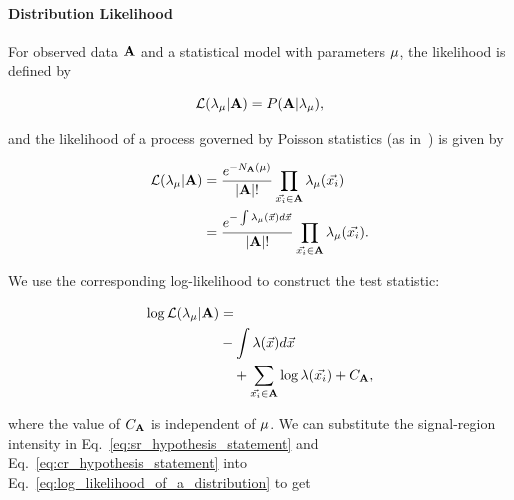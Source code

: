 \documentclass[paper/ddppaper2.tex]{subfiles}
\begin{document}
\paragraph{Distribution Likelihood}

For observed data ${\mathbf{A}}$ and a statistical model with parameters ${\mu}$, the likelihood is defined by

\begin{equation}
    \mathcal{L}(\lambda_{{\mu}} | {\mathbf{A}}) = P({\mathbf{A}} | \lambda_{{\mu}}),
\end{equation}

\noindent and the likelihood of a process governed by Poisson statistics (as in~\cite{LastDDPPaper}) is given by

\begin{equation}
\label{eq:likelihood_of_a_distribution}
\begin{aligned}
    \likelihood(\lambda_{\param} | \dataset{A})
    &= \dfrac{e^{-N_{\dataset{A}}(\param)}}{\abs{\dataset{A}}!}
    \prod\limits_{\event \in \dataset{A}}\lambda_{\param}(\event)
    \\
    &= \dfrac{e^{-\int \lambda_\param(\anyevent) d\anyevent}}{\abs{\dataset{A}}!}
    \prod\limits_{\event \in \dataset{A}}\lambda_{\param}(\event).
\end{aligned}
\end{equation}

We use the corresponding log-likelihood to construct the test statistic:

\begin{equation}
\label{eq:log_likelihood_of_a_distribution}
\begin{aligned}
    \llikelihood( \lambda_\param | \dataset{A}) &={}\\
    & -\int \lambda(\anyevent)d\anyevent\\
    &\quad + \sum_{\event \in \dataset{A}} \log\lambda(\event) + C_\dataset{A},
\end{aligned}
\end{equation}

\noindent where the value of $C_{{\mathbf{A}}}$ is independent of ${\mu}$. We can substitute the signal-region intensity in Eq.~\ref{eq:sr_hypothesis_statement} and Eq.~\ref{eq:cr_hypothesis_statement} into Eq.~\ref{eq:log_likelihood_of_a_distribution} to get
\end{document}
